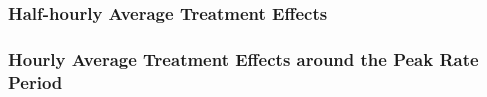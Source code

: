 \subsubsection{Half-hourly Average Treatment Effects}
\label{Sub-subsection:Half-hourly-Average-Treatment-Effects}



\subsubsection{Hourly Average Treatment Effects around the Peak Rate Period}
\label{Sub-subsection:Hourly-Average-Treatment-Effects-around-the-Peak-Rate-Period}
